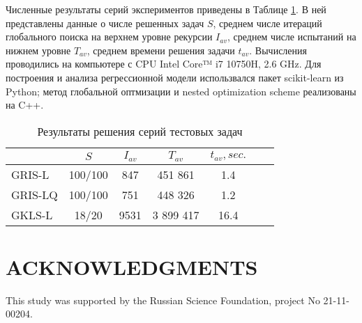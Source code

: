 \documentclass{aip-cp}
\begin{document}
Численные результаты серий экспериментов приведены в Таблице \ref{tab1}. В ней представлены данные о числе решенных задач $S$, среднем числе итераций глобального поиска на верхнем уровне рекурсии $I_{av}$, среднем числе испытаний на нижнем уровне $T_{av}$, среднем времени решения задачи $t_{av}$.
Вычисления проводились на компьютере с CPU Intel Core™ i7 10750H, 2.6 GHz. Для построения и анализа регрессионной модели использвался пакет scikit-learn из Python; метод глобальной оптмизации и nested optimization scheme реализованы на C++.


\begin{table}[ht]
	\caption{Результаты решения серий тестовых задач}
	\label{tab1}
		\begin{tabular}{ l c c c c c c } \hline
		 & $S$ &  $I_{av}$ &  $T_{av}$ & $t_{av}, sec.$ \\
    \hline
		GRIS-L & 100/100  & 847 &  451 861 & 1.4 \\
		GRIS-LQ & 100/100 & 751 &  448 326 & 1.2 \\
		GKLS-L & 18/20 & 9531 &  3 899 417 & 16.4 \\
		\hline
		\end{tabular}
\end{table}




\section{ACKNOWLEDGMENTS}
This study was supported by the Russian Science Foundation, project No 21-11-00204.




%
%
\end{document}
